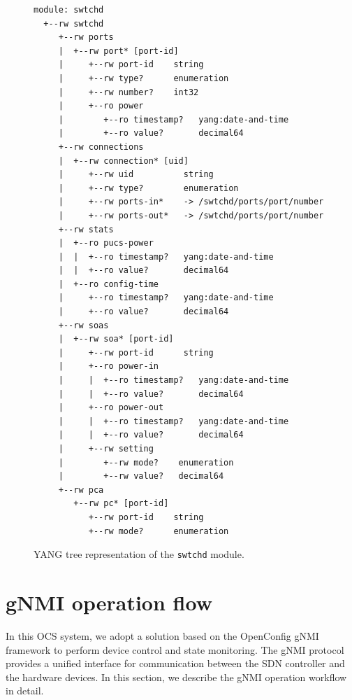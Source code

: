 \begin{figure}[H]
    \centering
    \begin{lstlisting}
module: swtchd
  +--rw swtchd
     +--rw ports
     |  +--rw port* [port-id]
     |     +--rw port-id    string
     |     +--rw type?      enumeration
     |     +--rw number?    int32
     |     +--ro power
     |        +--ro timestamp?   yang:date-and-time
     |        +--ro value?       decimal64
     +--rw connections
     |  +--rw connection* [uid]
     |     +--rw uid          string
     |     +--rw type?        enumeration
     |     +--rw ports-in*    -> /swtchd/ports/port/number
     |     +--rw ports-out*   -> /swtchd/ports/port/number
     +--rw stats
     |  +--ro pucs-power
     |  |  +--ro timestamp?   yang:date-and-time
     |  |  +--ro value?       decimal64
     |  +--ro config-time
     |     +--ro timestamp?   yang:date-and-time
     |     +--ro value?       decimal64
     +--rw soas
     |  +--rw soa* [port-id]
     |     +--rw port-id      string
     |     +--ro power-in
     |     |  +--ro timestamp?   yang:date-and-time
     |     |  +--ro value?       decimal64
     |     +--ro power-out
     |     |  +--ro timestamp?   yang:date-and-time
     |     |  +--ro value?       decimal64
     |     +--rw setting
     |        +--rw mode?    enumeration
     |        +--rw value?   decimal64
     +--rw pca
        +--rw pc* [port-id]
           +--rw port-id    string
           +--rw mode?      enumeration
\end{lstlisting}
    \caption{YANG tree representation of the \texttt{swtchd} module.}
    \label{fig:yang_tree}
\end{figure}

\section{gNMI operation flow}\label{sec:gnmi_operation_flow} %
In this OCS system, we adopt a solution based on the OpenConfig gNMI framework to perform device control and state monitoring.
The gNMI protocol provides a unified interface for communication between the SDN controller and the hardware devices.
In this section, we describe the gNMI operation workflow in detail.

